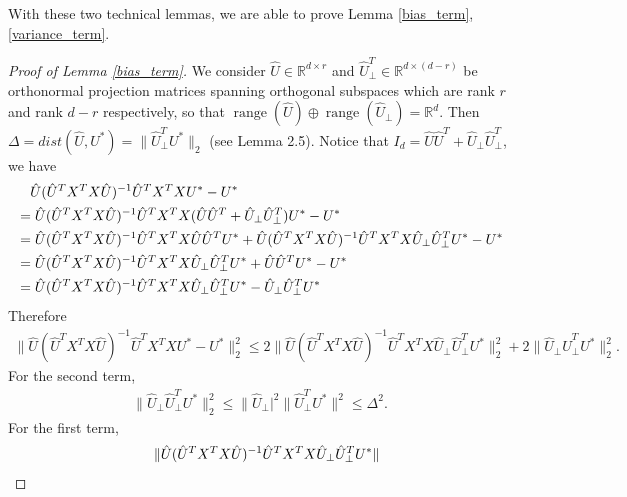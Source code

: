 With these two technical lemmas, we are able to prove Lemma \ref{bias_term}, \ref{variance_term}.
\begin{proof}[Proof of Lemma \ref{bias_term}] 
We consider $\hat{U} \in \mathbb{R}^{d \times r}$ and $\hat{U}_{\perp}^{T} \in \mathbb{R}^{d \times (d-r)}$ be orthonormal projection matrices spanning orthogonal subspaces which are rank $r$ and rank $d-r$ respectively, so that $ \operatorname{range}(\hat{U}) \oplus \operatorname{range}(\hat{U}_{\perp})=\mathbb{R}^d.$ Then $\Delta = dist (\hat{U},U^{*}) = \|\hat{U}_{\perp}^{T}U^{*}\|_{2}$ (see \citet{9584021} Lemma 2.5). Notice that $I_{d}=\hat{U}\hat{U}^{T} + \hat{U}_{\perp}\hat{U}_{\perp}^{T}$, we have 
\begin{align}
& \quad \hat{U}(\hat{U}^{T}X^{T}X\hat{U})^{-1}\hat{U}^{T}X^{T}X U^{*} - U^{*} \notag \\ 
&= \hat{U}(\hat{U}^{T}X^{T}X\hat{U})^{-1}\hat{U}^{T}X^{T}X (\hat{U}\hat{U}^{T} + \hat{U}_{\perp}\hat{U}_{\perp}^{T})U^{*} - U^{*} \notag \\
&= \hat{U}(\hat{U}^{T}X^{T}X\hat{U})^{-1}\hat{U}^{T}X^{T}X  \hat{U}\hat{U}^{T}U^{*} + \hat{U}(\hat{U}^{T}X^{T}X\hat{U})^{-1}\hat{U}^{T}X^{T}X\hat{U}_{\perp}\hat{U}_{\perp}^{T}U^{*} - U^{*} \notag \\
&=\hat{U}(\hat{U}^{T}X^{T}X\hat{U})^{-1}\hat{U}^{T}X^{T}X\hat{U}_{\perp}\hat{U}_{\perp}^{T}U^{*} + \hat{U}\hat{U}^{T}U^{*} - U^{*} \notag \\
&=\hat{U}(\hat{U}^{T}X^{T}X\hat{U})^{-1}\hat{U}^{T}X^{T}X\hat{U}_{\perp}\hat{U}_{\perp}^{T}U^{*} -\hat{U}_{\perp}\hat{U}_{\perp}^{T} U^{*} 
\end{align}
Therefore 
\begin{align} \label{decomposition2}
\|\hat{U}(\hat{U}^{T}X^{T}X\hat{U})^{-1}\hat{U}^{T}X^{T}X U^{*} - U^{*}\|_{2}^{2} \leq 2\|\hat{U}(\hat{U}^{T}X^{T}X\hat{U})^{-1}\hat{U}^{T}X^{T}X\hat{U}_{\perp}\hat{U}_{\perp}^{T}U^{*}\|_{2}^{2} + 2\|\hat{U}_{\perp}\hat{U}_{\perp}^{T} U^{*} \|_{2}^{2}.
\end{align}
For the second term, 
\begin{align} \label{second_term}
\|\hat{U}_{\perp}\hat{U}_{\perp}^{T} U^{*} \|_{2}^{2} \leq \|\hat{U}_{\perp}|^{2}   \|\hat{U}_{\perp}^{T} U^{*}\|^{2} \leq \Delta^{2}.
\end{align}
For the first term,
\begin{align} \label{decomposition1}
& \quad \|\hat{U}(\hat{U}^{T}X^{T}X\hat{U})^{-1}\hat{U}^{T}X^{T}X\hat{U}_{\perp}\hat{U}_{\perp}^{T}U^{*}\| \notag \\    

\end{align}
\end{proof}
